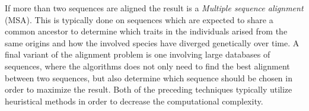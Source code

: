 \documentclass[thesis.tex]{subfiles}
\begin{document}
If more than two sequences are aligned the result is a \textit{Multiple sequence alignment} (MSA). This is typically done on sequences which are expected to share a common ancestor to determine which traits in the individuals arised from the same origins and how the involved species have diverged genetically over time. A final variant of the alignment problem is one involving large databases of sequences, where the algorithms does not only need to find the best alignment between two sequences, but also determine which sequence should be chosen in order to maximize the result. Both of the preceding techniques typically utilize heuristical methods in order to decrease the computational complexity.
\begin{table}[b]
  \centering
  \caption{The HOXD70 substitution matrix}
  \label{fig:substitution_matrix}
\end{table}
\clearpage
\end{document}
